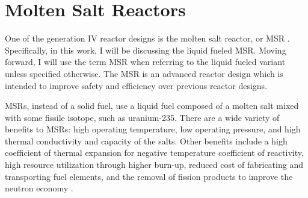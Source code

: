 
\section{Molten Salt Reactors}

One of the generation IV reactor designs is the molten salt reactor, or MSR \cite{kelly_generation_2014}. 
Specifically, in this work, I will be discussing the liquid fueled MSR.
Moving forward, I will use the term MSR when referring to the liquid fueled variant unless specified otherwise.
The MSR is an advanced reactor design which is intended to improve safety and efficiency over previous reactor designs.




MSRs, instead of a solid fuel, use a liquid fuel composed of a molten salt mixed with some fissile isotope, such as uranium-235.
There are a wide variety of benefits to MSRs: high operating temperature, low operating pressure, and high thermal conductivity and capacity of the salts.
Other benefits include a high coefficient of thermal expansion for negative temperature coefficient of reactivity, high resource utilization through higher burn-up, reduced cost of fabricating and transporting fuel elements, and the removal of fission products to improve the neutron economy \cite{serp_molten_2014}.

